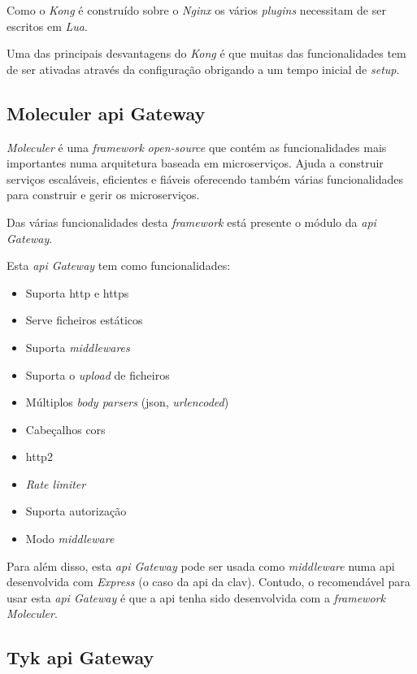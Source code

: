 Como o \textit{Kong} é construído sobre o \textit{Nginx} os vários \textit{plugins} necessitam de ser escritos em \textit{Lua}.

Uma das principais desvantagens do \textit{Kong} é que muitas das funcionalidades tem de ser ativadas através da configuração obrigando a um tempo inicial de \textit{setup}.

\subsection{Moleculer \acrshort{api} Gateway}

\textit{Moleculer} é uma \textit{framework} \textit{open-source} que contém as funcionalidades mais importantes numa arquitetura baseada em microserviços. Ajuda a construir serviços escaláveis, eficientes e fiáveis oferecendo também várias funcionalidades para construir e gerir os microserviços.

Das várias funcionalidades desta \textit{framework} está presente o módulo da \textit{\acrshort{api} Gateway}.

Esta \textit{\acrshort{api} Gateway} tem como funcionalidades:~\cite{moleculerAPIG}
\begin{itemize}
    \item Suporta \acrshort{http} e \acrshort{https}
    \item Serve ficheiros estáticos
    \item Suporta \textit{middlewares}
    \item Suporta o \textit{upload} de ficheiros
    \item Múltiplos \textit{body parsers} (\acrshort{json}, \textit{urlencoded})
    \item Cabeçalhos \acrshort{cors}
    \item \acrshort{http}2
    \item \textit{Rate limiter}
    \item Suporta autorização
    \item Modo \textit{middleware}
\end{itemize}

Para além disso, esta \textit{\acrshort{api} Gateway} pode ser usada como \textit{middleware} numa \acrshort{api} desenvolvida com \textit{Express} (o caso da \acrshort{api} da \acrshort{clav}). Contudo, o recomendável para usar esta \textit{\acrshort{api} Gateway} é que a \acrshort{api} tenha sido desenvolvida com a \textit{framework} \textit{Moleculer}.

\subsection{Tyk \acrshort{api} Gateway}

